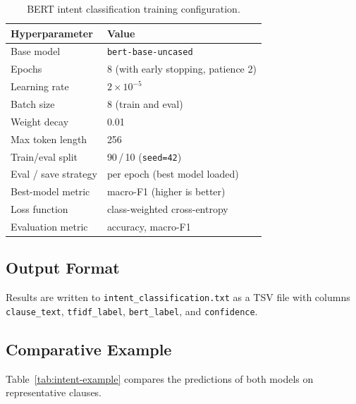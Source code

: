 \documentclass[assignment.tex]{subfiles}
\begin{document}
\begin{table}[H]
    \centering
    \caption{BERT intent classification training configuration.}
    \label{tab:bert-intent-config}
    \begin{tabular}{@{}ll@{}}
        \toprule
        \textbf{Hyperparameter} & \textbf{Value} \\
        \midrule
        Base model            & \texttt{bert-base-uncased} \\
        Epochs                & 8 (with early stopping, patience 2) \\
        Learning rate         & $2 \times 10^{-5}$ \\
        Batch size            & 8 (train and eval) \\
        Weight decay          & 0.01 \\
        Max token length      & 256 \\
        Train/eval split      & 90\,/\,10 (\texttt{seed=42}) \\
        Eval / save strategy  & per epoch (best model loaded) \\
        Best-model metric     & macro-F1 (higher is better) \\
        Loss function         & class-weighted cross-entropy \\
        Evaluation metric     & accuracy, macro-F1 \\
        \bottomrule
    \end{tabular}
\end{table}

\subsection{Output Format}

Results are written to \texttt{intent\_classification.txt} as a TSV
file with columns \texttt{clause\_text}, \texttt{tfidf\_label},
\texttt{bert\_label}, and \texttt{confidence}.

\subsection{Comparative Example}

Table~\ref{tab:intent-example} compares the predictions of both models on
representative clauses.
\end{document}
